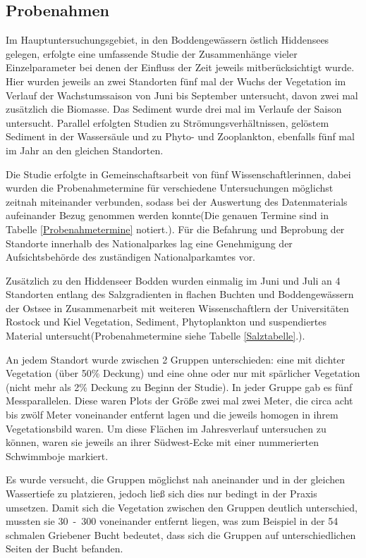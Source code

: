 \subsection{Probenahmen}

Im Hauptuntersuchungsgebiet, in den Boddengewässern östlich Hiddensees gelegen, erfolgte eine umfassende Studie der Zusammenhänge vieler Einzelparameter bei denen der Einfluss der Zeit jeweils mitberücksichtigt wurde. Hier wurden jeweils an zwei Standorten fünf mal der Wuchs der Vegetation im Verlauf der Wachstumssaison von Juni bis September untersucht, davon zwei mal zusätzlich die Biomasse. Das Sediment wurde drei mal im Verlaufe der Saison untersucht. Parallel erfolgten Studien zu Strömungsverhältnissen, gelöstem Sediment in der Wassersäule und zu Phyto- und Zooplankton, ebenfalls fünf mal im Jahr an den gleichen Standorten.

Die Studie erfolgte in Gemeinschaftsarbeit von fünf Wissenschaftlerinnen, dabei wurden die Probenahmetermine für verschiedene Untersuchungen möglichst zeitnah miteinander verbunden, sodass bei der Auswertung des Datenmaterials aufeinander Bezug genommen werden konnte(Die genauen Termine sind in Tabelle            \ref{Probenahmetermine} notiert.). Für die Befahrung und Beprobung der Standorte innerhalb des Nationalparkes lag eine Genehmigung der Aufsichtsbehörde des zuständigen Nationalparkamtes vor.

Zusätzlich zu den Hiddenseer Bodden wurden einmalig im Juni und Juli an 4 Standorten entlang des Salzgradienten in flachen Buchten und Boddengewässern der Ostsee  in Zusammenarbeit mit weiteren Wissenschaftlern der Universitäten Rostock und Kiel Vegetation, Sediment, Phytoplankton und suspendiertes Material untersucht(Probenahmetermine siehe Tabelle \ref{Salztabelle}.).

An jedem Standort wurde zwischen 2 Gruppen unterschieden: eine mit dichter Vegetation (über \unit{50}{\%} Deckung) und eine ohne oder nur mit spärlicher Vegetation (nicht mehr als \unit{2}{\%} Deckung zu Beginn der Studie). In jeder Gruppe gab es fünf Messparallelen. Diese waren Plots der Größe zwei mal zwei Meter, die circa acht bis zwölf Meter voneinander entfernt lagen und die jeweils homogen in ihrem Vegetationsbild waren. Um diese Flächen im Jahresverlauf untersuchen zu können, waren sie jeweils an ihrer Südwest-Ecke mit einer nummerierten Schwimmboje markiert.

Es wurde versucht, die Gruppen möglichst nah aneinander und in der gleichen Wassertiefe zu platzieren, jedoch ließ sich dies nur bedingt in der Praxis umsetzen. Damit sich die Vegetation zwischen den Gruppen deutlich unterschied, mussten sie \unit{30-300}{\metre} voneinander entfernt liegen, was zum Beispiel in der \unit{54}{\metre} schmalen Griebener Bucht bedeutet, dass sich die Gruppen auf unterschiedlichen Seiten der Bucht befanden. 


